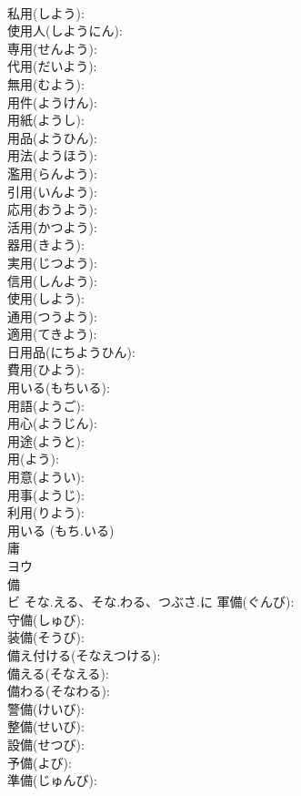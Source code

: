 \documentclass[8pt]{extreport}
\begin{document}
\begin{CJK}{UTF8}{min}
\\	私用(しよう): 
\\	使用人(しようにん): 
\\	専用(せんよう): 
\\	代用(だいよう): 
\\	無用(むよう): 
\\	用件(ようけん): 
\\	用紙(ようし): 
\\	用品(ようひん): 
\\	用法(ようほう): 
\\	濫用(らんよう): 
\\	引用(いんよう): 
\\	応用(おうよう): 
\\	活用(かつよう): 
\\	器用(きよう): 
\\	実用(じつよう): 
\\	信用(しんよう): 
\\	使用(しよう): 
\\	通用(つうよう): 
\\	適用(てきよう): 
\\	日用品(にちようひん): 
\\	費用(ひよう): 
\\	用いる(もちいる): 
\\	用語(ようご): 
\\	用心(ようじん): 
\\	用途(ようと): 
\\	用(よう): 
\\	用意(ようい): 
\\	用事(ようじ): 
\\	利用(りよう): 
\\	用いる (もち.いる)
\\	庸			
\\	ヨウ			
\\	備			
\\	ビ	そな.える、そな.わる、つぶさ.に	軍備(ぐんび): 
\\	守備(しゅび): 
\\	装備(そうび): 
\\	備え付ける(そなえつける): 
\\	備える(そなえる): 
\\	備わる(そなわる): 
\\	警備(けいび): 
\\	整備(せいび): 
\\	設備(せつび): 
\\	予備(よび): 
\\	準備(じゅんび): 

\end{CJK}
\end{document}
